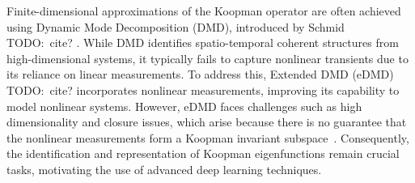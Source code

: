 \documentclass[conference]{IEEEtran}
\newcommand{\todo}[1]{{{\color{red} TODO:~#1	}} }
\begin{document}
Finite-dimensional approximations of the Koopman operator are often achieved using Dynamic Mode Decomposition (DMD), introduced by Schmid \todo{cite?}. While DMD identifies spatio-temporal coherent structures from high-dimensional systems, it typically fails to capture nonlinear transients due to its reliance on linear measurements. To address this, Extended DMD (eDMD)  \todo{cite?} incorporates nonlinear measurements, improving its capability to model nonlinear systems. However, eDMD faces challenges such as high dimensionality and closure issues, which arise because there is no guarantee that the nonlinear measurements form a Koopman invariant subspace~\cite{Lusch2018}. Consequently, the identification and representation of Koopman eigenfunctions remain crucial tasks, motivating the use of advanced deep learning techniques.
\end{document}
